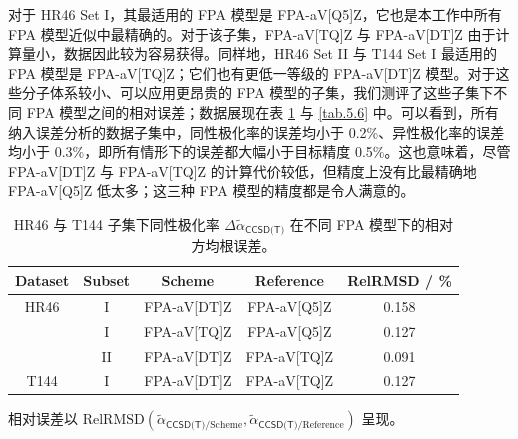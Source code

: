 对于 HR46 Set I，其最适用的 FPA 模型是 FPA-aV[Q5]Z，它也是本工作中所有 FPA 模型近似中最精确的。对于该子集，FPA-aV[TQ]Z 与 FPA-aV[DT]Z 由于计算量小，数据因此较为容易获得。同样地，HR46 Set II 与 T144 Set I 最适用的 FPA 模型是 FPA-aV[TQ]Z；它们也有更低一等级的 FPA-aV[DT]Z 模型。对于这些分子体系较小、可以应用更昂贵的 FPA 模型的子集，我们测评了这些子集下不同 FPA 模型之间的相对误差；数据展现在表 \ref{tab.5.5} 与 \ref{tab.5.6} 中。可以看到，所有纳入误差分析的数据子集中，同性极化率的误差均小于 0.2\%、异性极化率的误差均小于 0.3\%，即所有情形下的误差都大幅小于目标精度 0.5\%。这也意味着，尽管 FPA-aV[DT]Z 与 FPA-aV[TQ]Z 的计算代价较低，但精度上没有比最精确地 FPA-aV[Q5]Z 低太多；这三种 FPA 模型的精度都是令人满意的。

\begin{table}[ht]
    \centering
    \caption{HR46 与 T144 子集下同性极化率 $\Delta \tilde \alpha_\textsf{CCSD(T)}$ 在不同 FPA 模型下的相对方均根误差。}
    \label{tab.5.5}
    \begin{tabular}{ccccc}
    \hline
    Dataset & Subset & Scheme & Reference & RelRMSD / \% \\ \hline
    HR46    & I      & FPA-aV[DT]Z & FPA-aV[Q5]Z & 0.158 \\
            & I      & FPA-aV[TQ]Z & FPA-aV[Q5]Z & 0.127 \\
            & II     & FPA-aV[DT]Z & FPA-aV[TQ]Z & 0.091 \\
    T144    & I      & FPA-aV[DT]Z & FPA-aV[TQ]Z & 0.127 \\ \hline
    \end{tabular}

    \raggedright
    \par{} 相对误差以 $\text{RelRMSD} (\tilde \alpha_{\textsf{CCSD(T)}/\text{Scheme}}, \tilde \alpha_{\textsf{CCSD(T)}/\text{Reference}})$ 呈现。
\end{table}


